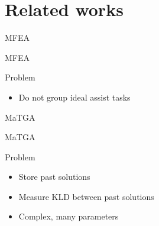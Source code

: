 \section{Related works}

\begin{frame}{MFEA}
    \begin{block}{MFEA}
    \end{block}
    \begin{block}{Problem}
        \begin{itemize}
            \item Do not group ideal assist tasks
        \end{itemize}
    \end{block}
\end{frame}

\begin{frame}{MaTGA}
    \begin{block}{MaTGA}
    \end{block}
    \begin{block}{Problem}
        \begin{itemize}
            \item Store past solutions
            \item Measure KLD between past solutions
            \item Complex, many parameters
        \end{itemize}
    \end{block}
\end{frame}
